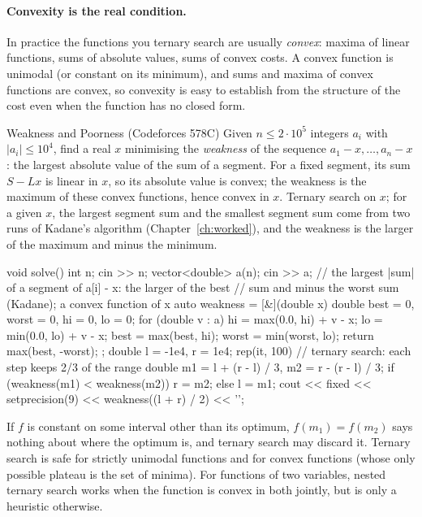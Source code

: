
\paragraph{Convexity is the real condition.} In practice the functions you ternary search are usually \emph{convex}:
maxima of linear functions, sums of absolute values, sums of convex costs. A convex function is unimodal (or constant on its
minimum), and sums and maxima of convex functions are convex, so convexity is easy to establish from the structure of the
cost even when the function has no closed form.

\begin{problem}{Weakness and Poorness (Codeforces 578C)}
Given $n \le 2\cdot10^5$ integers $a_i$ with $|a_i| \le 10^4$, find a real $x$ minimising the \emph{weakness} of the sequence
$a_1 - x, \ldots, a_n - x$: the largest absolute value of the sum of a segment.
\solution For a fixed segment, its sum $S - Lx$ is linear in $x$, so its absolute value is convex; the weakness is the
maximum of these convex functions, hence convex in $x$. Ternary search on $x$; for a given $x$, the largest segment sum and
the smallest segment sum come from two runs of Kadane's algorithm (Chapter~\ref{ch:worked}), and the weakness is the larger
of the maximum and minus the minimum.
\end{problem}

\begin{code}
void solve() {
    int n;
    cin >> n;
    vector<double> a(n);
    cin >> a;
    // the largest |sum| of a segment of a[i] - x: the larger of the best
    // sum and minus the worst sum (Kadane); a convex function of x
    auto weakness = [&](double x) {
        double best = 0, worst = 0, hi = 0, lo = 0;
        for (double v : a) {
            hi = max(0.0, hi) + v - x;
            lo = min(0.0, lo) + v - x;
            best = max(best, hi);
            worst = min(worst, lo);
        }
        return max(best, -worst);
    };
    double l = -1e4, r = 1e4;
    rep(it, 100) {  // ternary search: each step keeps 2/3 of the range
        double m1 = l + (r - l) / 3, m2 = r - (r - l) / 3;
        if (weakness(m1) < weakness(m2)) r = m2;
        else l = m1;
    }
    cout << fixed << setprecision(9) << weakness((l + r) / 2) << '\n';
}
\end{code}

\begin{pitfall}
If $f$ is constant on some interval other than its optimum, $f(m_1) = f(m_2)$ says nothing about where the optimum is, and
ternary search may discard it. Ternary search is safe for strictly unimodal functions and for convex functions (whose only
possible plateau is the set of minima). For functions of two variables, nested ternary search works when the function is
convex in both jointly, but is only a heuristic otherwise.
\end{pitfall}

